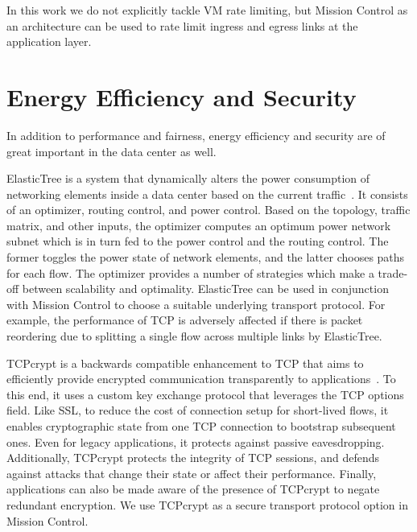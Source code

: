 \documentclass[a4paper,12pt,twoside,openright]{report}
\begin{document}
In this work we do not explicitly tackle VM rate limiting, but Mission Control
as an architecture can be used to rate limit ingress and egress links at the
application layer.

\section{Energy Efficiency and Security}
In addition to performance and fairness, energy efficiency and security are of
great important in the data center as well. 

ElasticTree is a system that dynamically alters the power consumption of
networking elements inside a data center based on the current
traffic~\cite{Heller:2010:ESE}. It consists of an optimizer, routing control,
and power control. Based on the topology, traffic matrix, and other inputs, the
optimizer computes an optimum power network subnet which is in turn fed to the
power control and the routing control. The former toggles the power state of
network elements, and the latter chooses paths for each flow. The optimizer
provides a number of strategies which make a trade-off between scalability and
optimality. ElasticTree can be used in conjunction with Mission Control to
choose a suitable underlying transport protocol. For example, the performance of
TCP is adversely affected if there is packet reordering due to splitting a
single flow across multiple links by ElasticTree.

TCPcrypt is a backwards compatible enhancement to TCP that aims to efficiently
provide encrypted communication transparently to applications~\cite{bittau:the}.
To this end, it uses a custom key exchange protocol that leverages the TCP
options field. Like SSL, to reduce the cost of connection setup for short-lived
flows, it enables cryptographic state from one TCP connection to bootstrap
subsequent ones. Even for legacy applications, it protects against passive
eavesdropping. Additionally, TCPcrypt protects the integrity of TCP sessions,
and defends against attacks that change their state or affect their performance.
Finally, applications can also be made aware of the presence of TCPcrypt to
negate redundant encryption. We use TCPcrypt as a secure transport protocol
option in Mission Control.
\end{document}
